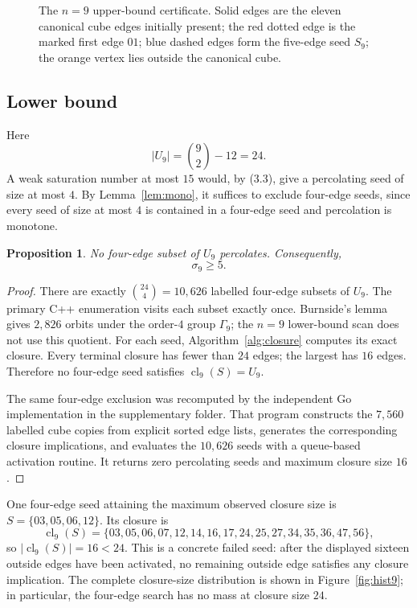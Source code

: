 \documentclass[11pt]{article}
\numberwithin{equation}{section}
\newtheorem{proposition}[theorem]{Proposition}
\newcommand{\cl}{\operatorname{cl}}
\begin{document}
\begin{figure}[t]
\centering
\resizebox{0.72\linewidth}{!}{}
\caption{The $n=9$ upper-bound certificate. Solid edges are the eleven canonical cube edges initially present; the red dotted edge is the marked first edge $01$; blue dashed edges form the five-edge seed $S_9$; the orange vertex lies outside the canonical cube.}
\label{fig:n9seed}
\end{figure}

\subsection{Lower bound}
Here
\[
|U_9|=\binom92-12=24.
\]
A weak saturation number at most $15$ would, by (3.3), give a percolating seed of size at most $4$. By Lemma~\ref{lem:mono}, it suffices to exclude four-edge seeds, since every seed of size at most $4$ is contained in a four-edge seed and percolation is monotone.

\begin{proposition}\label{prop:n9lower}
No four-edge subset of $U_9$ percolates. Consequently,
\[
\sigma_9\ge5.
\]
\end{proposition}

\begin{proof}
There are exactly $\binom{24}{4}=10,626$ labelled four-edge subsets of $U_9$. The primary C++ enumeration visits each subset exactly once. Burnside's lemma gives $2,826$ orbits under the order-$4$ group $\Gamma_9$; the $n=9$ lower-bound scan does not use this quotient. For each seed, Algorithm~\ref{alg:closure} computes its exact closure. Every terminal closure has fewer than $24$ edges; the largest has $16$ edges. Therefore no four-edge seed satisfies $\cl_9(S)=U_9$.

The same four-edge exclusion was recomputed by the independent Go implementation in the supplementary folder. That program constructs the $7,560$ labelled cube copies from explicit sorted edge lists, generates the corresponding closure implications, and evaluates the $10,626$ seeds with a queue-based activation routine. It returns zero percolating seeds and maximum closure size $16$.
\end{proof}

One four-edge seed attaining the maximum observed closure size is
$S=\{03,05,06,12\}$. Its closure is
\[
\cl_9(S)=\{03,05,06,07,12,14,16,17,24,25,27,34,35,36,47,56\},
\]
so $|\cl_9(S)|=16<24$. This is a concrete failed seed: after the displayed
sixteen outside edges have been activated, no remaining outside edge satisfies
any closure implication. The complete closure-size distribution is shown in
Figure~\ref{fig:hist9}; in particular, the four-edge search has no mass at
closure size $24$.
\end{document}
